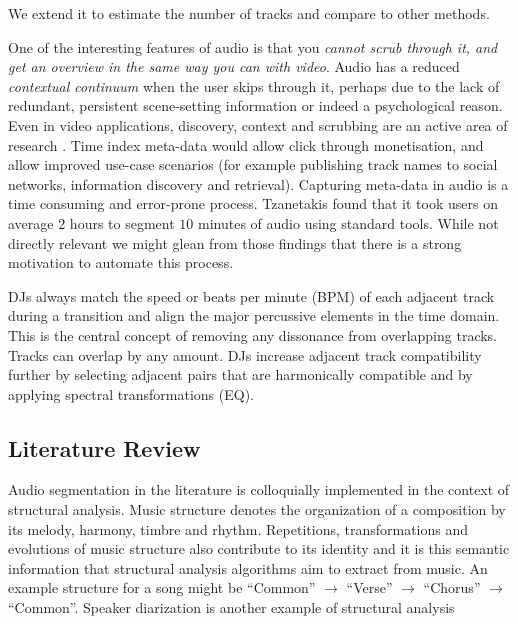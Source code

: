 \documentclass[twocolumn]{article}
\begin{document}
	 
	
	
	We extend it to estimate the number of tracks and compare to other methods. %
	
	One of the interesting features of audio is that you \textit{cannot scrub through it, and get an overview in the same way you can with video}. Audio has a reduced \textit{contextual continuum} when the user skips through it, perhaps due to the lack of redundant, persistent scene-setting information or indeed a psychological reason. Even in video applications, discovery, context and scrubbing are an active area of research \cite{Matejka:2013:SIO:2470654.2466149}. Time index meta-data would allow click through monetisation, and allow improved use-case scenarios (for example publishing track names to social networks, information discovery and retrieval). Capturing meta-data in audio is a time consuming and error-prone process. Tzanetakis \cite{tzanetakis1999framework} found that it took users on average $2$ hours to segment $10$ minutes of audio using standard tools. While not directly relevant we might glean from those findings that there is a strong motivation to automate this process.
	
	DJs always match the speed or beats per minute (BPM) of each adjacent track during a transition and align the major percussive elements in the time domain. This is the central concept of removing any dissonance from overlapping tracks. Tracks can overlap by any amount. DJs increase adjacent track compatibility further by selecting adjacent pairs that are harmonically compatible and by applying spectral transformations (EQ).
	
	\subsection{Literature Review}
	
	Audio segmentation in the literature is colloquially implemented in the context of structural analysis. Music structure denotes the organization of a composition by its melody, harmony, timbre and rhythm. Repetitions, transformations and evolutions of music structure also contribute to its identity and it is this semantic information that structural analysis algorithms aim to extract from music. An example structure for a song might be ``Common'' $\rightarrow$ ``Verse'' $\rightarrow$ ``Chorus'' $\rightarrow$ ``Common''. Speaker diarization is another example of structural analysis 
	
\end{document}
